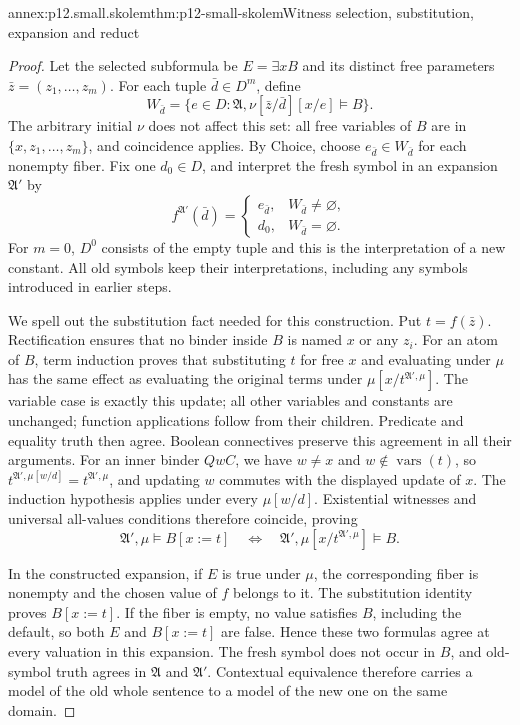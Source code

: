 \begin{annexitem}{annex:p12.small.skolem}{thm:p12-small-skolem}{Witness selection, substitution, expansion and reduct}
\begin{proof}
Let the selected subformula be \(E=\exists x B\) and its distinct
free parameters \(\bar z=(z_1,\ldots,z_m)\). For each tuple
\(\bar d\in D^m\), define
\[
 W_{\bar d}=\{e\in D:
       \mathfrak A,\nu[\bar z/\bar d][x/e]\models B\}.
\]
The arbitrary initial \(\nu\) does not affect this set: all free
variables of \(B\) are in \(\{x,z_1,\ldots,z_m\}\), and
coincidence applies. By Choice, choose \(e_{\bar d}\in W_{\bar d}\)
for each nonempty fiber. Fix one \(d_0\in D\), and interpret
the fresh symbol in an expansion \(\mathfrak A'\) by
\[
 f^{\mathfrak A'}(\bar d)=
 \begin{cases}
 e_{\bar d},&W_{\bar d}\ne\varnothing,\\
 d_0,&W_{\bar d}=\varnothing.
 \end{cases}
\]
For \(m=0\), \(D^0\) consists of the empty tuple and this is
the interpretation of a new constant. All old symbols keep their
interpretations, including any symbols introduced in earlier steps.

We spell out the substitution fact needed for this construction.
Put \(t=f(\bar z)\). Rectification ensures that no binder inside
\(B\) is named \(x\) or any \(z_i\). For an atom of \(B\),
term induction proves that substituting \(t\) for free \(x\)
and evaluating under \(\mu\) has the same effect as evaluating
the original terms under \(\mu[x/t^{\mathfrak A',\mu}]\).
The variable case is exactly this update; all other variables and
constants are unchanged; function applications follow from their
children. Predicate and equality truth then agree. Boolean
connectives preserve this agreement in all their arguments.
For an inner binder \(Qw C\), we have \(w\ne x\) and
\(w\notin\operatorname{vars}(t)\), so
\(t^{\mathfrak A',\mu[w/d]}=t^{\mathfrak A',\mu}\), and
updating \(w\) commutes with the displayed update of \(x\).
The induction hypothesis applies under every \(\mu[w/d]\).
Existential witnesses and universal all-values conditions therefore
coincide, proving
\[
 \mathfrak A',\mu\models B[x:=t]
 \quad\Longleftrightarrow\quad
 \mathfrak A',\mu[x/t^{\mathfrak A',\mu}]\models B.
\]

In the constructed expansion, if \(E\) is true under \(\mu\),
the corresponding fiber is nonempty and the chosen value of \(f\)
belongs to it. The substitution identity proves \(B[x:=t]\).
If the fiber is empty, no value satisfies \(B\), including the
default, so both \(E\) and \(B[x:=t]\) are false. Hence these
two formulas agree at every valuation in this expansion. The fresh
symbol does not occur in \(B\), and old-symbol truth agrees in
\(\mathfrak A\) and \(\mathfrak A'\). Contextual equivalence
therefore carries a model of the old whole sentence to a model of
the new one on the same domain.


\end{proof}
\end{annexitem}
